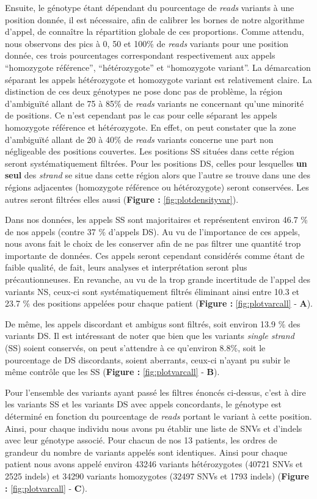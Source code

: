 \documentclass[12pt,a4paper,twoside]{ugathesis}
\begin{document}
Ensuite, le génotype étant dépendant du pourcentage de \emph{reads}
variants à une position donnée, il est nécessaire, afin de calibrer les
bornes de notre algorithme d'appel, de connaître la répartition globale
de ces proportions. Comme attendu, nous observons des pics à 0, 50 et
100\% de \emph{reads} variants pour une position donnée, ces trois
pourcentages correspondant respectivement aux appels ``homozygote
référence'', ``hétérozygote'' et ``homozygote variant''. La démarcation
séparant les appels hétérozygote et homozygote variant est relativement
claire. La distinction de ces deux génotypes ne pose donc pas de
problème, la région d'ambiguïté allant de 75 à 85\% de \emph{reads}
variants ne concernant qu'une minorité de positions. Ce n'est cependant
pas le cas pour celle séparant les appels homozygote référence et
hétérozygote. En effet, on peut constater que la zone d'ambiguïté allant
de 20 à 40\% de \emph{reads} variants concerne une part non négligeable
des positions couvertes. Les positions SS situées dans cette région
seront systématiquement filtrées. Pour les positions DS, celles pour
lesquelles \textbf{un seul} des \emph{strand} se situe dans cette région
alors que l'autre se trouve dans une des régions adjacentes (homozygote
référence ou hétérozygote) seront conservées. Les autres seront filtrées
elles aussi (\textbf{Figure : }\ref{fig:plotdensityvar}).

Dans nos données, les appels SS sont majoritaires et représentent
environ 46.7 \% de nos appels (contre 37 \% d'appels DS). Au vu de
l'importance de ces appels, nous avons fait le choix de les conserver
afin de ne pas filtrer une quantité trop importante de données. Ces
appels seront cependant considérés comme étant de faible qualité, de
fait, leurs analyses et interprétation seront plus précautionneuses. En
revanche, au vu de la trop grande incertitude de l'appel des variants
NS, ceux-ci sont systématiquement filtrés éliminant ainsi entre 10.3 et
23.7 \% des positions appelées pour chaque patient (\textbf{Figure :
}\ref{fig:plotvarcall} - \textbf{A}).

De même, les appels discordant et ambigus sont filtrés, soit environ
13.9 \% des variants DS. Il est intéressant de noter que bien que les
variants \emph{single strand} (SS) soient conservés, on peut s'attendre
à ce qu'environ 8.8\%, soit le pourcentage de DS discordants, soient
aberrants, ceux-ci n'ayant pu subir le même contrôle que les SS
(\textbf{Figure : }\ref{fig:plotvarcall} - \textbf{B}).

Pour l'ensemble des variants ayant passé les filtres énoncés ci-dessus,
c'est à dire les variants SS et les variants DS avec appels concordants,
le génotype est déterminé en fonction du pourcentage de \emph{reads}
portant le variant à cette position. Ainsi, pour chaque individu nous
avons pu établir une liste de SNVs et d'indels avec leur génotype
associé. Pour chacun de nos 13 patients, les ordres de grandeur du
nombre de variants appelés sont identiques. Ainsi pour chaque patient
nous avons appelé environ 43246 variants hétérozygotes (40721 SNVs et
2525 indels) et 34290 variants homozygotes (32497 SNVs et 1793 indels)
(\textbf{Figure : }\ref{fig:plotvarcall} - \textbf{C}).
\end{document}
